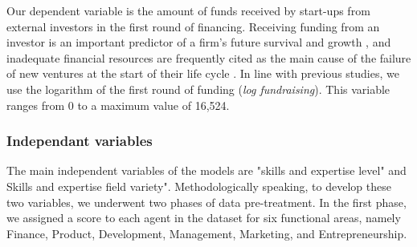 \documentclass[12pt]{article}
\begin{document}
Our dependent variable is the amount of funds received by start-ups from external investors in the first round of financing. Receiving funding from an investor is an important predictor of a firm's future survival and growth \citep{beckman2007early}, and inadequate financial resources are frequently cited as the main cause of the failure of new ventures at the start of their life cycle \citep{franke2008venture, eddleston2016you}. In line with previous studies, we use the logarithm of the first round of funding (\textit{log fundraising}). This variable ranges from 0 to a maximum value of 16,524.

\subsubsection{Independant variables}

The main independent variables of the models are "skills and expertise level" and Skills and expertise field variety". Methodologically speaking, to develop these two variables, we underwent two phases of data pre-treatment. In the first phase, we assigned a score to each agent in the dataset for six functional areas, namely Finance, Product, Development, Management, Marketing, and Entrepreneurship.


\end{document}
